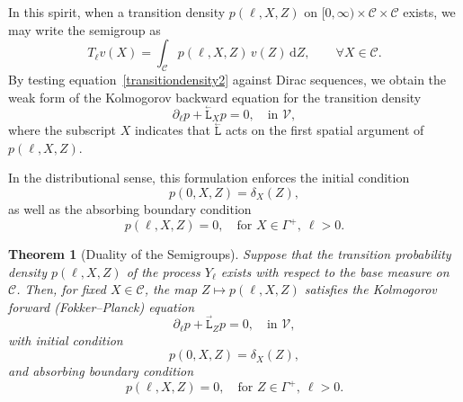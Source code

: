 \documentclass{amsart}
\newcommand{\dd}{{\mathrm d}}
\newcommand{\fL}{\stackrel{_\rightarrow}{\mathtt L}}
\newcommand{\bL}{\stackrel{_\leftarrow}{\mathtt L}}
\theoremstyle{plain}
\newtheorem{theorem}{Theorem}[section]
\newcommand{\cV}{\ensuremath{\mathscr V}}
\begin{document}
In this spirit, when a transition density $p(\ell, X, Z)$ on $[0,
  \infty) \times \mathcal{C} \times \mathcal{C}$ exists, we may write
  the semigroup as
  \begin{equation}
    T_\ell v(X) = \int_{\mathcal{C}} p(\ell, X, Z)\, v(Z)\, \dd Z, \qquad \forall X \in \mathcal{C}.
  \end{equation}
  By testing equation~\eqref{transitiondensity2} against Dirac
  sequences, we obtain the weak form of the Kolmogorov backward
  equation for the transition density
  \begin{equation}
    \partial_\ell p + \bL_X p = 0, \quad \text{in } \cV,
    \label{BP}
  \end{equation}
  where the subscript $X$ indicates that $\bL$ acts on the first
  spatial argument of $p(\ell, X, Z)$.

  In the distributional sense, this formulation enforces the initial condition
  \begin{equation}
    p(0, X, Z) = \delta_X(Z),
  \end{equation}
  as well as the absorbing boundary condition
  \begin{equation}
    p(\ell, X, Z) = 0, \quad \text{for } X \in \Gamma^+,~ \ell > 0.
  \end{equation}
  
  \begin{theorem}[Duality of the Semigroups]
    \label{lemma:semigroup}
    Suppose that the transition probability density $p(\ell, X, Z)$ of
    the process $Y_\ell$ exists with respect to the base measure on
    $\mathcal{C}$. Then, for fixed $X \in \mathcal{C}$, the map $Z
    \mapsto p(\ell, X, Z)$ satisfies the Kolmogorov forward
    (Fokker--Planck) equation
    \begin{equation}
      \partial_\ell p + \fL_Z p = 0, \quad \text{in } \cV,
      \label{FP}
    \end{equation}
    with initial condition
    \begin{equation}
      p(0, X, Z) = \delta_X(Z),
    \end{equation}
    and absorbing boundary condition
    \begin{equation}
      p(\ell, X, Z) = 0, \quad \text{for } Z \in \Gamma^+,~ \ell > 0.
      \label{zeroZ}
    \end{equation}
  \end{theorem}
  
\end{document}
